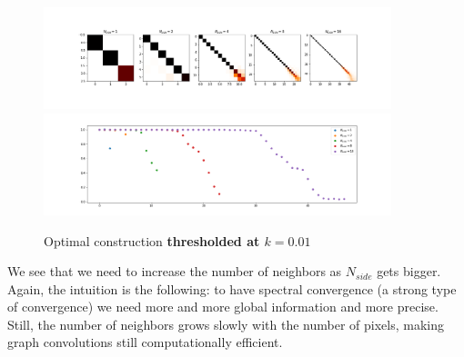 \begin{figure}[h]
	
	
	\centering
	\includegraphics[width=0.9\textwidth]{../codes/02.HeatKernelGraphLaplacian/HEALPix/06_figures/optimal_thresholded.png}	
	\includegraphics[width=0.9\textwidth]{../codes/02.HeatKernelGraphLaplacian/HEALPix/06_figures/optimal_thresholded_diagonal.png}
	\caption{\label{fig:optimal_thresholded}Optimal construction \textbf{thresholded at $k=0.01$}}
\end{figure}

We see that we need to increase the number of neighbors as $N_{side}$ gets bigger. Again, the intuition is the following: to have spectral convergence (a strong type of convergence) we need more and more global information and more precise.  Still, the number of neighbors grows slowly with the number of pixels, making graph convolutions still computationally efficient.

